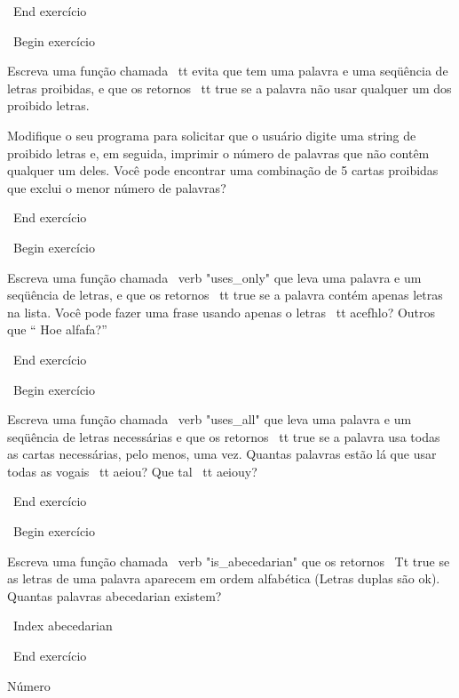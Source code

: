 \documentclass[10pt]{book}
\begin{document}
\begin {itemize}
{{{{{{\ End {} exercício


\ Begin {} exercício 

Escreva uma função chamada {\ tt evita}
que tem uma palavra e uma seqüência de letras proibidas, e
que os retornos {\ tt true} se a palavra não usar qualquer um dos proibido
letras.

Modifique o seu programa para solicitar que o usuário digite uma string
de proibido letras e, em seguida, imprimir o número de palavras que
não contêm qualquer um deles.
Você pode encontrar uma combinação de 5 cartas proibidas que
exclui o menor número de palavras?

\ End {} exercício



\ Begin {} exercício

Escreva uma função chamada \ verb "uses_only" que leva uma palavra e um
seqüência de letras, e que os retornos {\ tt true} se a palavra contém
apenas letras na lista. Você pode fazer uma frase usando apenas o
letras {\ tt acefhlo}? Outros que `` Hoe alfafa?''

\ End {} exercício


\ Begin {} exercício 

Escreva uma função chamada \ verb "uses_all" que leva uma palavra e um
seqüência de letras necessárias e que os retornos {\ tt true} se a palavra
usa todas as cartas necessárias, pelo menos, uma vez. Quantas palavras estão lá
que usar todas as vogais {\ tt aeiou}? Que tal {\ tt aeiouy}?

\ End {} exercício


\ Begin {} exercício

Escreva uma função chamada \ verb "is_abecedarian" que os retornos
{\ Tt true} se as letras de uma palavra aparecem em ordem alfabética
(Letras duplas são ok).  
Quantas palavras abecedarian existem?

\ Index {} abecedarian

\ End {} exercício



Número%



}}}}}}
\end{itemize}
\end{document}
